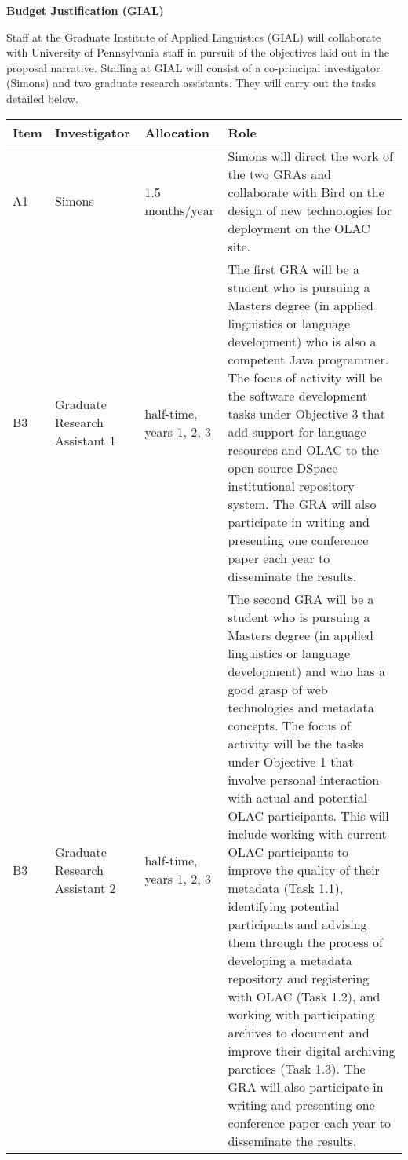 \documentclass[11pt]{nsf}
\begin{document}
\begin{center}\textbf{\Large
Budget Justification (GIAL)
}\end{center}

Staff at the Graduate Institute of Applied Linguistics (GIAL) will
collaborate with University of Pennsylvania staff in pursuit of the
objectives laid out in the proposal narrative.
Staffing at GIAL will consist of a co-principal investigator (Simons)
and two graduate research assistants.  They will carry out the tasks
detailed below.

\vspace{1ex}

{\small\noindent
\begin{tabular}{lllp{3in}}
\textbf{Item} &
\textbf{Investigator} & \textbf{Allocation} & \textbf{Role} \\ \hline

A1 & Simons & 1.5 months/year &
Simons will direct the work of the two GRAs and collaborate with Bird
on the design of new technologies for deployment on the OLAC site.\\

B3 & Graduate Research Assistant 1 & half-time, years 1, 2, 3 &
The first GRA will be a student who is pursuing a Masters degree (in 
applied linguistics or language development) who is also
a competent Java programmer. The focus of activity will be
the software development tasks under Objective 3 that add
support for language resources and OLAC to the open-source DSpace
institutional repository system. The GRA will also participate
in writing and presenting one conference paper each year
to disseminate the results. \\

B3 & Graduate Research Assistant 2 & half-time, years 1, 2, 3 &
The second GRA will be a student who is pursuing a Masters degree (in 
applied linguistics or language development) and who has a good grasp of web technologies and
metadata concepts. The focus of activity will be
the tasks under Objective 1 that involve personal interaction
with actual and potential OLAC participants.  This will include
working with current OLAC participants to improve the quality of their
metadata (Task 1.1), identifying potential participants and advising
them through the process of developing a metadata repository and registering with
OLAC (Task 1.2), and working with participating archives to document
and improve their digital archiving parctices (Task 1.3). The GRA will also participate
in writing and presenting one conference paper each year
to disseminate the results.\\


\end{tabular}}
\end{document}

